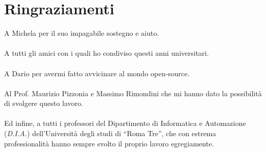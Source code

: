 \chapter*{Ringraziamenti}

A Michela per il suo impagabile sostegno e aiuto.\\
\\
A tutti gli amici con i quali ho condiviso questi anni universitari.\\
\\
A Dario per avermi fatto avvicinare al mondo open-source.\\
\\
Al Prof. Maurizio Pizzonia e Massimo Rimondini che mi hanno dato la possibilità di svolgere questo lavoro.\\
\\
Ed infine, a tutti i professori del Dipartimento di Informatica e Automazione (\emph{D.I.A.}) dell'Università degli studi di ``Roma Tre'', che con estrema professionalità hanno sempre svolto il proprio lavoro egregiamente.
